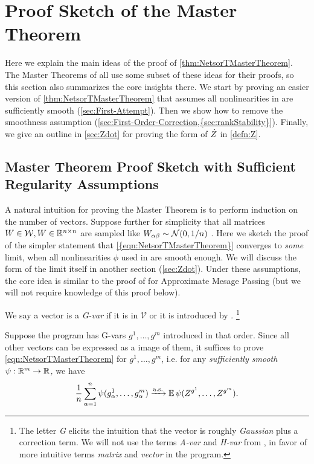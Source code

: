 \documentclass[main.tex]{subfiles}
\begin{document}
\section{Proof Sketch of the Master Theorem}
\label{sec:proofsketch}

Here we explain the main ideas of the proof of \cref{thm:NetsorTMasterTheorem}.
The Master Theorems of \citet{yangTP1,yangTP2} all use some subset of these ideas for their proofs, so this section also summarizes the core insights there.
We start by proving an easier version of \cref{thm:NetsorTMasterTheorem} that assumes all nonlinearities in  are sufficiently smooth (\cref{sec:First-Attempt}).
Then we show how to remove the smoothness assumption (\cref{sec:First-Order-Correction,{sec:rankStability}}).
Finally, we give an outline in \cref{sec:Zdot} for proving the form of $\dot Z$ in \cref{defn:Z}.

\subsection{Master Theorem Proof Sketch with Sufficient Regularity Assumptions\label{sec:First-Attempt}}

A natural intuition for proving the Master Theorem is to perform induction on the number of vectors. Suppose further for simplicity that all matrices $W\in\mathcal{W},W\in\mathbb{R}^{n\times n}$ are sampled like $W_{\alpha\beta}\sim\mathcal{N}(0,1/n)$ . Here we sketch the proof of the simpler statement that \cref{{eqn:NetsorTMasterTheorem}} converges to \emph{some} limit, when all nonlinearities $\phi$ used in  are smooth enough. We will discuss the form of the limit itself in another section (\cref{sec:Zdot}). Under these assumptions, the core idea is similar to the proof of \citet{bayati_dynamics_2011} for Approximate Mesage Passing (but we will not require knowledge of this proof below).
\begin{defn}   
We say a vector is a \emph{G-var} if it is in $\mathcal{V}$ or it is introduced by .%
\footnote{
    The letter \emph{G} elicits the intuition that the vector is roughly \emph{Gaussian} plus a correction term.
    We will not use the terms \emph{A-var} and \emph{H-var} from \citet{yangScalingLimitsWide2019arXiv.org,yangTP1,yangTP2}, in favor of more intuitive terms \emph{matrix} and \emph{vector} in the program.
}
\end{defn}
Suppose the program has G-vars $g^{1},\ldots,g^{m}$ introduced in that order. Since all other vectors can be expressed as a  image of them, it suffices to prove \cref{eqn:NetsorTMasterTheorem} for $g^{1},\ldots,g^{m}$, i.e. for any \emph{sufficiently smooth $\psi:\mathbb{R}^{m}\to\mathbb{R}$, }we have
\begin{equation}
\f 1n\sum_{\alpha=1}^{n}\psi(g_{\alpha}^{1},\ldots,g_{\alpha}^{m})\asto\EV\psi(Z^{g^{1}},\ldots,Z^{g^{m}}).\label{eq:MomentGvars}
\end{equation}
\end{document}
